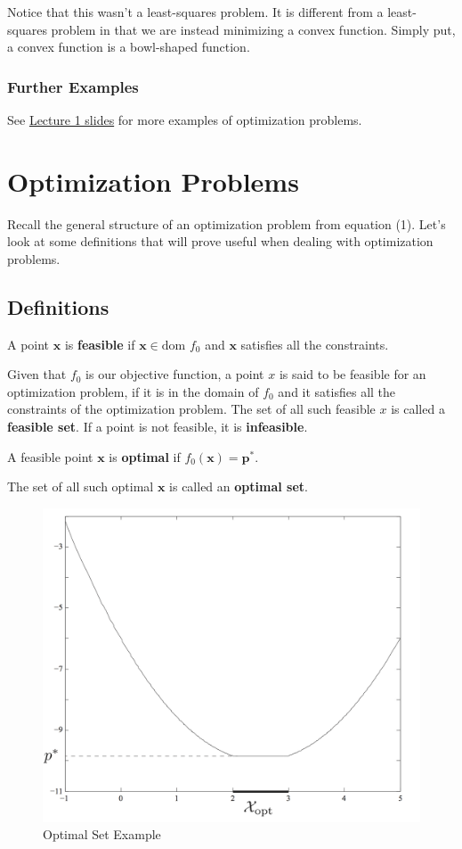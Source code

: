 \documentclass[12pt]{article}
\begin{document}
\noindent Notice that this wasn't a least-squares problem. It is different from a least-squares problem in that we are instead minimizing a convex function. Simply put, a convex function is a bowl-shaped function.
\subsubsection{Further Examples}
See \href{https://bcourses.berkeley.edu/courses/1473158/files/73475329/download?wrap=1}{Lecture 1 slides} for more examples of optimization problems.
\newpage
\section{Optimization Problems}
Recall the general structure of an optimization problem from equation (1). Let's look at some definitions that will prove useful when dealing with optimization problems.
\subsection{Definitions}
\begin{definition}
A point $\mathbf{x}$ is \textbf{feasible} if $\mathbf{x}\in\text{dom } f_0$ and $\mathbf{x}$ satisfies all the constraints.
\end{definition}
\noindent Given that $f_0$ is our objective function, a point $x$ is said to be feasible for an optimization problem, if it is in the domain of $f_0$ and it satisfies all the constraints of the optimization problem. The set of all such feasible $x$ is called a \textbf{feasible set}. If a point is not feasible, it is \textbf{infeasible}.
\begin{definition}
A feasible point $\mathbf{x}$ is \textbf{optimal} if $f_0(\mathbf{x})=\mathbf{p}^*$.
\end{definition}
\noindent The set of all such optimal $\mathbf{x}$ is called an \textbf{optimal set}.
\begin{figure}[h!]\begin{center}\includegraphics[scale=0.3]{figures/optimalset}\caption{Optimal Set Example}\end{center}\end{figure}
\end{document}
